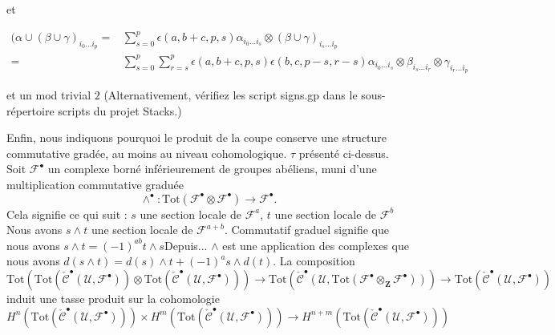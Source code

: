 et

\begin{align*}
(\alpha \cup (\beta \cup \gamma)_{i_0\ldots i_p}
= &
\sum\nolimits_{s = 0}^p
\epsilon(a, b + c, p, s)
\alpha_{i_0 \ldots i_s} \otimes (\beta \cup \gamma)_{i_s \ldots i_p}
\\
= &
\sum\nolimits_{s = 0}^p
\sum\nolimits_{r = s}^p
\epsilon(a, b + c, p, s) \epsilon(b, c, p - s, r - s)
\alpha_{i_0 \ldots i_s} \otimes \beta_{i_s \ldots i_r} \otimes
\gamma_{i_r \ldots i_p}
\end{align*}

et un mod trivial $2$ (Alternativement, vérifiez les script signs.gp dans le sous-répertoire scripts du projet Stacks.)

\medskip\noindent

Enfin, nous indiquons pourquoi le produit de la coupe conserve une structure commutative gradée, au moins au niveau cohomologique.
$\tau$ présenté ci-dessus. Soit ${\mathcal F}^\bullet$ un complexe borné inférieurement de groupes abéliens, muni d'une multiplication commutative graduée
$$
\wedge^\bullet :
\text{Tot}({\mathcal F}^\bullet\otimes {\mathcal F}^\bullet)
\longrightarrow
{\mathcal F}^\bullet.
$$
Cela signifie ce qui suit : $s$ une section locale de
${\mathcal F}^a$, $t$ une section locale de ${\mathcal F}^b$
Nous avons $s \wedge t$ une section locale de ${\mathcal F}^{a + b}$. Commutatif graduel signifie que nous avons
$s \wedge t = (-1)^{ab} t \wedge s$Depuis... $\wedge$ est une application des complexes que nous avons
$d(s\wedge t) = d(s) \wedge t + (-1)^a s \wedge d(t)$. La composition
$$
\text{Tot}(
\text{Tot}(\check{\mathcal{C}}^\bullet({\mathcal U}, {\mathcal F}^\bullet))
\otimes
\text{Tot}(\check{\mathcal{C}}^\bullet({\mathcal U}, {\mathcal F}^\bullet))
)
\to
\text{Tot}(
\check{\mathcal{C}}^\bullet({\mathcal U},
\text{Tot}({\mathcal F}^\bullet\otimes_{\mathbf Z}{\mathcal F}^\bullet))
)
\to
\text{Tot}(\check{\mathcal{C}}^\bullet({\mathcal U}, {\mathcal F}^\bullet))
$$
induit une tasse produit sur la cohomologie
$$
H^n(
\text{Tot}(\check{\mathcal{C}}^\bullet({\mathcal U}, {\mathcal F}^\bullet))
)
\times
H^m(
\text{Tot}(\check{\mathcal{C}}^\bullet({\mathcal U}, {\mathcal F}^\bullet))
)
\longrightarrow
H^{n + m}(
\text{Tot}(\check{\mathcal{C}}^\bullet({\mathcal U}, {\mathcal F}^\bullet))
)
$$
